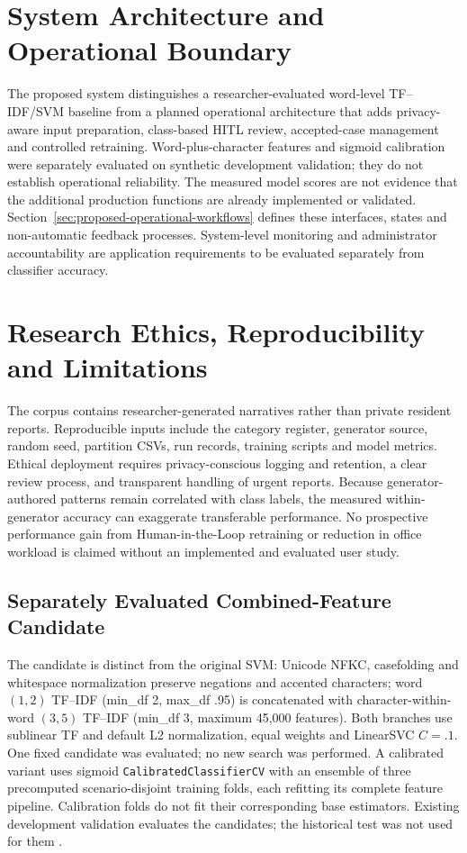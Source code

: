 \section{System Architecture and Operational Boundary}
The proposed system distinguishes a researcher-evaluated word-level TF--IDF/SVM baseline from a planned operational architecture that adds privacy-aware input preparation, class-based HITL review, accepted-case management and controlled retraining. Word-plus-character features and sigmoid calibration were separately evaluated on synthetic development validation; they do not establish operational reliability. The measured model scores are not evidence that the additional production functions are already implemented or validated. Section~\ref{sec:proposed-operational-workflows} defines these interfaces, states and non-automatic feedback processes. System-level monitoring and administrator accountability are application requirements to be evaluated separately from classifier accuracy.



\section{Research Ethics, Reproducibility and Limitations}
The corpus contains researcher-generated narratives rather than private resident reports. Reproducible inputs include the category register, generator source, random seed, partition CSVs, run records, training scripts and model metrics. Ethical deployment requires privacy-conscious logging and retention, a clear review process, and transparent handling of urgent reports. Because generator-authored patterns remain correlated with class labels, the measured within-generator accuracy can exaggerate transferable performance. No prospective performance gain from Human-in-the-Loop retraining or reduction in office workload is claimed without an implemented and evaluated user study.

\subsection{Separately Evaluated Combined-Feature Candidate}\label{sec:candidate-final}
The candidate is distinct from the original SVM: Unicode NFKC, casefolding and whitespace normalization preserve negations and accented characters; word $(1,2)$ TF--IDF (min\_df 2, max\_df .95) is concatenated with character-within-word $(3,5)$ TF--IDF (min\_df 3, maximum 45,000 features). Both branches use sublinear TF and default L2 normalization, equal weights and LinearSVC $C=.1$. One fixed candidate was evaluated; no new search was performed. A calibrated variant uses sigmoid \texttt{CalibratedClassifierCV} with an ensemble of three precomputed scenario-disjoint training folds, each refitting its complete feature pipeline. Calibration folds do not fit their corresponding base estimators. Existing development validation evaluates the candidates; the historical test was not used for them \cite{sklearncalib,sklearnpitfalls}.

